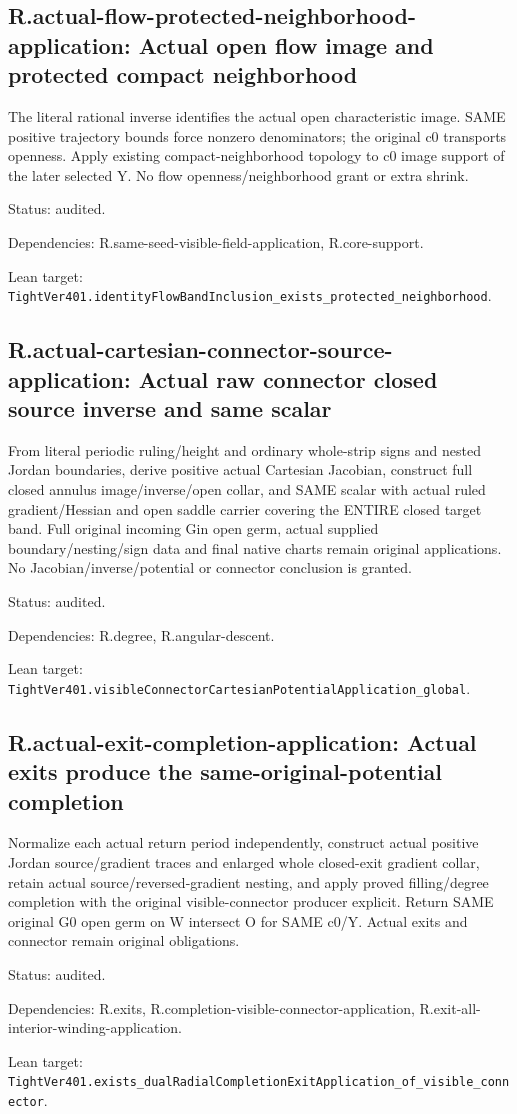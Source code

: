 \documentclass{article}
\begin{document}
\subsection*{R.actual-flow-protected-neighborhood-application: Actual open flow image and protected compact neighborhood}
The literal rational inverse identifies the actual open characteristic image. SAME positive trajectory bounds force nonzero denominators; the original c0 transports openness. Apply existing compact-neighborhood topology to c0 image support of the later selected Y. No flow openness/neighborhood grant or extra shrink.
\par Status: audited.
\par Dependencies: R.same-seed-visible-field-application, R.core-support.
\par Lean target: \texttt{TightVer401.identityFlowBandInclusion\_exists\_protected\_neighborhood}.
\subsection*{R.actual-cartesian-connector-source-application: Actual raw connector closed source inverse and same scalar}
From literal periodic ruling/height and ordinary whole-strip signs and nested Jordan boundaries, derive positive actual Cartesian Jacobian, construct full closed annulus image/inverse/open collar, and SAME scalar with actual ruled gradient/Hessian and open saddle carrier covering the ENTIRE closed target band. Full original incoming Gin open germ, actual supplied boundary/nesting/sign data and final native charts remain original applications. No Jacobian/inverse/potential or connector conclusion is granted.
\par Status: audited.
\par Dependencies: R.degree, R.angular-descent.
\par Lean target: \texttt{TightVer401.visibleConnectorCartesianPotentialApplication\_global}.
\subsection*{R.actual-exit-completion-application: Actual exits produce the same-original-potential completion}
Normalize each actual return period independently, construct actual positive Jordan source/gradient traces and enlarged whole closed-exit gradient collar, retain actual source/reversed-gradient nesting, and apply proved filling/degree completion with the original visible-connector producer explicit. Return SAME original G0 open germ on W intersect O for SAME c0/Y. Actual exits and connector remain original obligations.
\par Status: audited.
\par Dependencies: R.exits, R.completion-visible-connector-application, R.exit-all-interior-winding-application.
\par Lean target: \texttt{TightVer401.exists\_dualRadialCompletionExitApplication\_of\_visible\_connector}.
\end{document}
